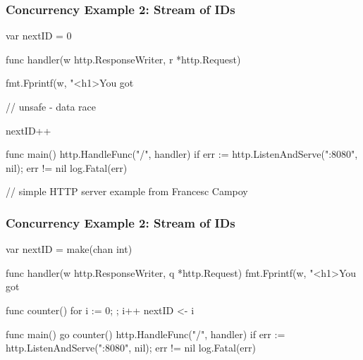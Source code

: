 \documentclass[handout,compress,t,11pt]{beamer}
\begin{document}
\begin{frame}[fragile]
\frametitle{Concurrency Example 2: Stream of IDs}
\begin{golang}
var nextID = 0

func handler(w http.ResponseWriter, r *http.Request) {
    fmt.Fprintf(w, "<h1>You got %

    // unsafe - data race

    nextID++
}

func main() {
    http.HandleFunc("/", handler)
    if err := http.ListenAndServe(":8080", nil); err != nil {
        log.Fatal(err)
    }
}

// simple HTTP server example from Francesc Campoy
\end{golang}
\end{frame}

\begin{frame}[fragile]
\frametitle{Concurrency Example 2: Stream of IDs}
\begin{golang}
var nextID = make(chan int)

func handler(w http.ResponseWriter, q *http.Request) {
    fmt.Fprintf(w, "<h1>You got %
}

func counter() {
    for i := 0; ; i++ {
        nextID <- i
    }
}

func main() {
    go counter()
    http.HandleFunc("/", handler)
    if err := http.ListenAndServe(":8080", nil); err != nil {
        log.Fatal(err)
    }
}
\end{golang}
\end{frame}
\end{document}
